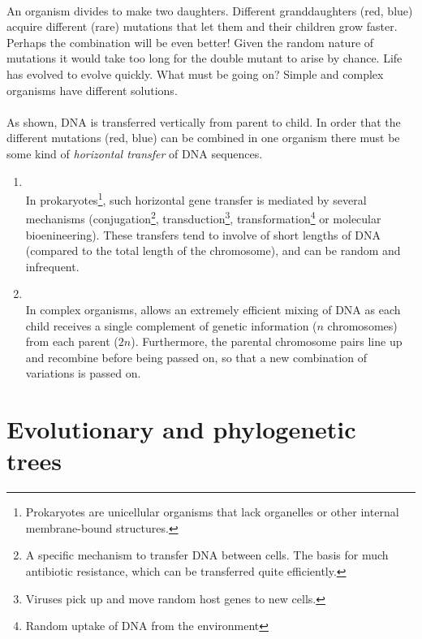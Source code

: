 \\[.1in]
An organism divides to make two daughters. Different granddaughters (red, blue) acquire different (rare) mutations that let them and their children grow faster. Perhaps the combination will be even better! Given the random nature of mutations it would take too long for the double mutant to arise by chance. Life has evolved to evolve quickly. What must be going on? Simple and complex organisms have different solutions. \\[.2in]
\\[.1in]
As shown, DNA is transferred vertically from parent to child. In order that the different mutations (red, blue) can be combined in one organism there must be some kind of \textit{horizontal transfer} of DNA sequences.
\begin{enumerate}
    \item {}\\ In prokaryotes\footnote{Prokaryotes are unicellular organisms that lack organelles or other internal membrane-bound structures.}, such horizontal gene transfer is mediated by several mechanisms (conjugation\footnote{A specific mechanism to transfer DNA between cells. The basis for much antibiotic resistance, which can be transferred quite efficiently.}, transduction\footnote{Viruses pick up and move random host genes to new cells.}, transformation\footnote{Random uptake of DNA from the environment} or molecular bioenineering). These transfers tend to involve  of short lengths of DNA (compared to the total length of the chromosome), and can be random and infrequent.
    
   \item {}\\ In complex organisms,  allows an extremely efficient mixing of DNA as each child receives a single complement of genetic information ($n$ chromosomes) from each parent ($2n$). Furthermore, the parental chromosome pairs line up and recombine before being passed on, so that a new combination of variations is passed on.
\end{enumerate}


\section{Evolutionary and phylogenetic trees}

